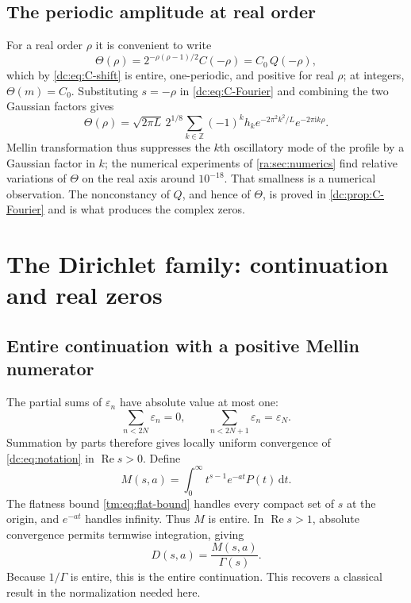 \documentclass[11pt,a4paper,oneside,openany]{book}
\numberwithin{equation}{chapter}
\theoremstyle{definition}
\theoremstyle{remark}
\newcommand{\eps}{\varepsilon}
\newcommand{\Z}{\mathbb Z}
\newcommand{\dd}{\,\mathrm d}
\newcommand{\ii}{\mathrm i}
\DeclareMathOperator{\Rea}{Re}
\begin{document}
\section{The periodic amplitude at real order}
For a real order $\rho$ it is convenient to write
\begin{equation}\label{ra:eq:Thetadef}
 \Theta(\rho)=2^{-\rho(\rho-1)/2}C(-\rho)=C_0\,Q(-\rho),
\end{equation}
which by \eqref{dc:eq:C-shift} is entire, one-periodic, and positive for real
$\rho$; at integers, $\Theta(m)=C_0$. Substituting $s=-\rho$ in
\eqref{dc:eq:C-Fourier} and combining the two Gaussian factors gives
\begin{equation}\label{ra:eq:Thetafourier}
 \Theta(\rho)=\sqrt{2\pi L}\,2^{1/8}
 \sum_{k\in\Z}(-1)^kh_ke^{-2\pi^2k^2/L}e^{-2\pi\ii k\rho}.
\end{equation}
Mellin transformation thus suppresses the $k$th oscillatory mode of the
profile by a Gaussian factor in $k$; the numerical experiments of
\cref{ra:sec:numerics} find relative variations of $\Theta$ on the real axis
around $10^{-18}$. That smallness is a numerical observation. The
nonconstancy of $Q$, and hence of $\Theta$, is proved in
\cref{dc:prop:C-Fourier} and is what produces the complex zeros.

\chapter{The Dirichlet family: continuation and real zeros}
\label{dc:sec:dirichlet}

\section{Entire continuation with a positive Mellin numerator}
The partial sums of $\eps_n$ have absolute value at most one:
\[
 \sum_{n<2N}\eps_n=0,\qquad
 \sum_{n<2N+1}\eps_n=\eps_N.
\]
Summation by parts therefore gives locally uniform convergence of
\cref{dc:eq:notation} in $\Rea s>0$. Define
\begin{equation}
 M(s,a)=\int_0^\infty t^{s-1}e^{-at}P(t)\dd t.
 \label{dc:eq:M-def}
\end{equation}
The flatness bound \cref{tm:eq:flat-bound} handles every compact set of
$s$ at the origin, and $e^{-at}$ handles infinity. Thus $M$ is
entire. In $\Rea s>1$, absolute convergence permits termwise
integration, giving
\begin{equation}
 \boxed{D(s,a)=\frac{M(s,a)}{\Gamma(s)}.}
 \label{dc:eq:D-continuation}
\end{equation}
Because $1/\Gamma$ is entire, this is the entire continuation.
This recovers a classical result in the normalization needed here.
\end{document}
